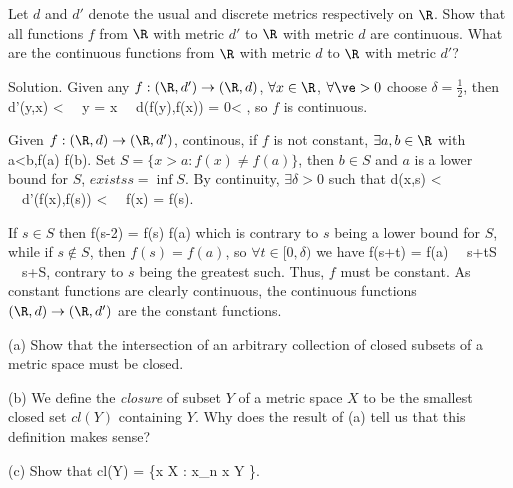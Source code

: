 \een

\begin{exercise}
Let $d$ and $d'$ denote the usual and discrete metrics respectively on $\R$. Show that all functions $f$ from $\R$ with metric $d'$ to $\R$ with metric $d$ are continuous. What are the continuous functions from $\R$ with metric $d$ to $\R$ with metric $d'$?
\end{exercise}

Solution. Given any $f:(\R,d') \to (\R,d)$, $\forall x\in\R$, $\forall \ve >0$ choose $\delta=\frac 12$, then
\be
d'(y,x) < \delta \ \ra \ y = x \ \ra \ d(f(y),f(x)) = 0< \ve,
\ee
so $f$ is continuous. 

Given $f:(\R,d) \to (\R,d')$, continous, if $f$ is not constant, $\exists a,b\in\R$ with 
\be
a<b,\quad f(a) \neq f(b).
\ee
Set $S = \{x>a:f(x)\neq f(a)\}$, then $b\in S$ and $a$ is a lower bound for $S$, $exists s = \inf S$. By continuity, $\exists \delta >0$ such that
\be
d(x,s) < \delta \ \ra \ d'(f(x),f(s)) <  \ \ra \ f(x) = f(s).
\ee

If $s\in S$ then
\be
f(s-\tfrac{\delta}2) = f(s) \neq f(a)
\ee
which is contrary to $s$ being a lower bound for $S$, while if $s\notin S$, then $f(s) = f(a)$, so $\forall t\in [0,\delta)$ we have
\be
f(s+t) = f(a) \ \ra \ s+t\notin S \ \ra \ s+\delta {}S,
\ee
contrary to $s$ being the greatest such. Thus, $f$ must be constant. As constant functions are clearly continuous, the continuous functions $(\R,d)\to (\R,d')$ are the constant functions.

\begin{exercise}
\ben
\item [(a)] Show that the intersection of an arbitrary collection of closed subsets of a metric space must be closed.
\item [(b)] We define the \emph{closure} of subset $Y$ of a metric space $X$ to be the smallest closed set $cl(Y)$ containing $Y$. Why does the result of (a) tell us that this definition makes sense?
\item [(c)] Show that
\be
cl(Y) = \{x \in X : x_n \to x Y \}.
\ee
\een
\end{exercise}

